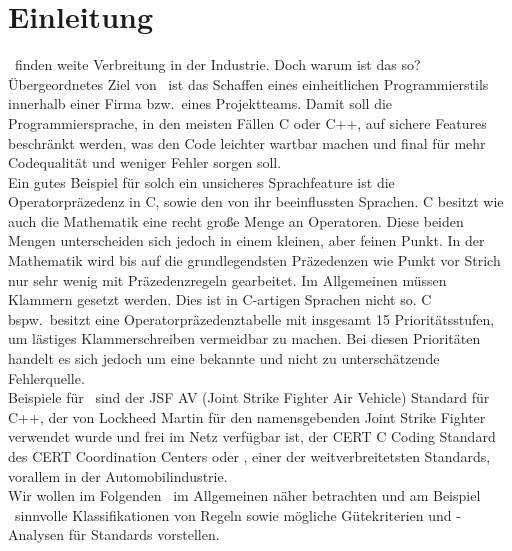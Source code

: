 \documentclass[a4paper,UKenglish,cleveref, autoref]{templates/lipics-v2019}
\begin{document}
    \section{Einleitung}
    \label{sec:einleitung}
    \sqss\ finden weite Verbreitung in der Industrie.
    Doch warum ist das so?
    Übergeordnetes Ziel von \sqss\ ist das Schaffen eines einheitlichen Programmierstils innerhalb einer Firma bzw.\ eines
    Projektteams.
    Damit soll die Programmiersprache, in den meisten Fällen C oder C++, auf sichere Features beschränkt werden, was den
    Code leichter wartbar machen und final für mehr Codequalität und weniger Fehler sorgen soll.\\
    Ein gutes Beispiel für solch ein unsicheres Sprachfeature ist die Operatorpräzedenz in C, sowie den von ihr beeinflussten
    Sprachen.
    C besitzt wie auch die Mathematik eine recht große Menge an Operatoren.
    Diese beiden Mengen unterscheiden sich jedoch in einem kleinen, aber feinen Punkt.
    In der Mathematik wird bis auf die grundlegendsten Präzedenzen wie Punkt vor Strich nur sehr wenig mit Präzedenzregeln
    gearbeitet.
    Im Allgemeinen müssen Klammern gesetzt werden.
    Dies ist in C-artigen Sprachen nicht so.
    C bspw.\ besitzt eine Operatorpräzedenztabelle mit insgesamt 15 Prioritätsstufen, um lästiges Klammerschreiben vermeidbar
    zu machen.
    Bei diesen Prioritäten handelt es sich jedoch um eine bekannte und nicht zu unterschätzende Fehlerquelle.\\
    Beispiele für \sqss\ sind der JSF AV (Joint Strike Fighter Air Vehicle) Standard für C++, der von Lockheed Martin
    für den namensgebenden Joint Strike Fighter verwendet wurde und frei im Netz verfügbar ist, der CERT C Coding
    Standard des CERT Coordination Centers oder \misra, einer der weitverbreitetsten Standards, vorallem in der
    Automobilindustrie.\\
    Wir wollen im Folgenden \sqss\ im Allgemeinen näher betrachten und am Beispiel \misra\ sinnvolle Klassifikationen
    von Regeln sowie mögliche Gütekriterien und -Analysen für Standards vorstellen.
\end{document}
